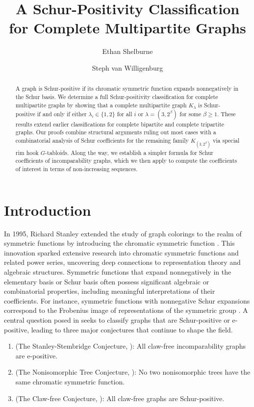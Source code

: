 \documentclass[12pt]{amsart}
\numberwithin{equation}{section}
\theoremstyle{plain}
\theoremstyle{definition}
\theoremstyle{remark}
\begin{document}
\title{A Schur-Positivity Classification for
Complete Multipartite Graphs}


\author{Ethan Shelburne}
\author{Steph van Willigenburg}


\begin{abstract}
A graph is Schur-positive if its chromatic symmetric function expands nonnegatively in the Schur basis. We determine a full Schur-positivity classification for complete multipartite graphs by showing that a complete multipartite graph $K_\lambda$ is Schur-positive if and only if either $\lambda_i\in \{1,2\}$ for all $i$ or $\lambda=(3,2^\beta)$ for some $\beta\ge 1$. These results extend earlier classifications for complete bipartite and complete tripartite graphs. Our proofs combine structural arguments ruling out most cases with a combinatorial analysis of Schur coefficients for the remaining family $K_{(3,2^\beta)}$ via special rim hook $G$-tabloids. Along the way, we establish a simpler formula for Schur coefficients of incomparability graphs, which we then apply to compute the coefficients of interest in terms of non-increasing sequences.
\end{abstract}

\maketitle
 


\section{Introduction}

In 1995, Richard Stanley extended the study of graph colorings to the realm of symmetric functions by introducing the chromatic symmetric function \cite{stan_95}. This innovation sparked extensive research into chromatic symmetric functions and related power series, uncovering deep connections to representation theory and algebraic structures. Symmetric functions that expand nonnegatively in the elementary basis or Schur basis often possess significant algebraic or combinatorial properties, including meaningful interpretations of their coefficients. For instance, symmetric functions with nonnegative Schur expansions correspond to the Frobenius image of representations of the symmetric group \cite{sym_group}. A central question posed in \cite{stan_95} seeks to classify graphs that are Schur-positive or e-positive, leading to three major conjectures that continue to shape the field.
\begin{enumerate}

\item (The Stanley-Stembridge Conjecture, \cite{stan_93}): All claw-free incomparability graphs are e-positive.

\item (The Nonisomorphic Tree Conjecture, \cite{stan_95}): No two nonisomorphic trees have the same chromatic symmetric function.

\item (The Claw-free Conjecture, \cite{stan_98}): All claw-free graphs are Schur-positive.

\end{enumerate}
\end{document}
